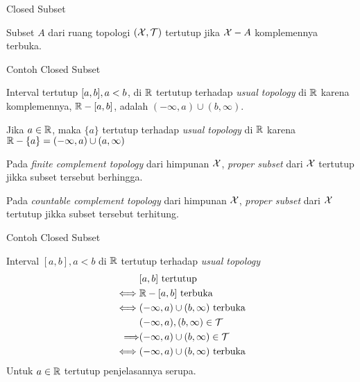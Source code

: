 \begin{frame}{Closed Subset}
    \begin{tcolorbox}[enhanced,title=Definisi, frame style tile={width=\paperwidth}{\wallpaper}]
        Subset $A$ dari ruang topologi $(\mathcal{X}, \mathcal{T})$ tertutup jika $\mathcal{X} - A$ komplemennya terbuka.
    \end{tcolorbox}
\end{frame}

\begin{frame}{Contoh Closed Subset}
    \begin{tcolorbox}[enhanced,title=Contoh 38, frame style tile={width=\paperwidth}{\wallpaper}]
        Interval tertutup $[a,b], a < b$, di $\mathbb{R}$ tertutup terhadap \textit{usual topology}
        di $\mathbb{R}$ karena komplemennya, $\mathbb{R}-[a,b]$, adalah $(-\infty, a) \cup (b,\infty)$.

        Jika $a \in \mathbb{R}$, maka $\{a\}$ tertutup terhadap \textit{usual topology} di $\mathbb{R}$ karena 
        $\mathbb{R} - \{a\}=(-\infty,a) \cup (a,\infty)$

        Pada \textit{finite complement topology} dari himpunan $\mathcal{X}$, \textit{proper subset} dari
        $\mathcal{X}$ tertutup jikka subset tersebut berhingga.

        Pada \textit{countable complement topology} dari himpunan $\mathcal{X}$, \textit{proper subset} dari
        $\mathcal{X}$ tertutup jikka subset tersebut terhitung.
    \end{tcolorbox}
\end{frame}

\begin{frame}{Contoh Closed Subset}
    \begin{tcolorbox}[enhanced,title=Contoh 38 (Penjelasan), frame style tile={width=\paperwidth}{\wallpaper}]
        Interval $[a,b],a<b$ di $\mathbb{R}$ tertutup terhadap \textit{usual topology}
        \begin{align*}
            &[a,b] \text{ tertutup}\\
            \iff &\mathbb{R} - [a,b] \text{ terbuka}\\
            \iff &(-\infty, a) \cup (b,\infty) \text{ terbuka}\\
            &(-\infty, a),(b,\infty)\in \mathcal{T}\\
            \Longrightarrow& (-\infty, a) \cup (b,\infty) \in \mathcal{T}\\
            \iff&(-\infty, a) \cup (b,\infty) \text{ terbuka}\\
        \end{align*}
        Untuk $a\in \mathbb{R}$ tertutup penjelasannya serupa.
    \end{tcolorbox}
\end{frame}

